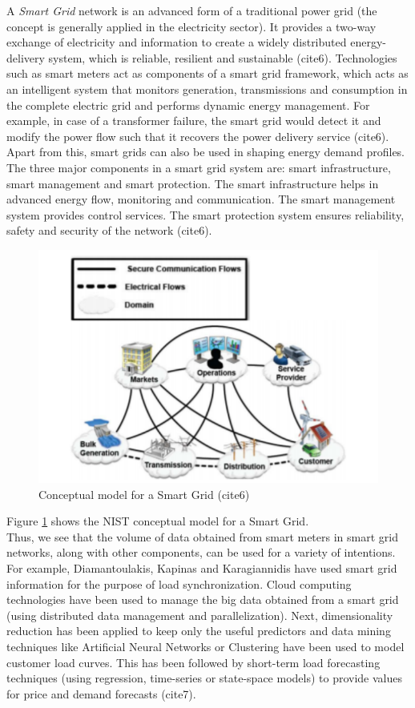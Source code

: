 A {\em Smart Grid} network is an advanced form of a traditional power grid (the concept is generally applied in the electricity sector). It provides a two-way exchange of electricity and information to create a widely distributed energy-delivery system, which is reliable, resilient and sustainable (cite6). Technologies such as smart meters act as components of a smart grid framework, which acts as an intelligent system that monitors generation, transmissions and consumption in the complete electric grid and performs dynamic energy management. For example, in case of a transformer failure, the smart grid would detect it and modify the power flow such that it recovers the power delivery service (cite6). Apart from this, smart grids can also be used in shaping energy demand profiles. The three major components in a smart grid system are: smart infrastructure, smart management and smart protection. The smart infrastructure helps in advanced energy flow, monitoring and communication. The smart management system provides control services. The smart protection system ensures reliability, safety and security of the network (cite6).
\begin{figure}
	\includegraphics[width=\columnwidth]{images/smart_grid.pdf}
	\caption{Conceptual model for a Smart Grid (cite6)}
	\label{F:grid}
\end{figure}
Figure \ref{F:grid} shows the NIST conceptual model for a Smart Grid.\\
Thus, we see that the volume of data obtained from smart meters in smart grid networks, along with other components, can be used for a variety of intentions. For example, Diamantoulakis, Kapinas and Karagiannidis have used smart grid information for the purpose of load synchronization. Cloud computing technologies have been used to manage the big data obtained from a smart grid (using distributed data management and parallelization). Next, dimensionality reduction has been applied to keep only the useful predictors and data mining techniques like Artificial Neural Networks or Clustering have been used to model customer load curves. This has been followed by short-term load forecasting techniques (using regression, time-series or state-space models) to provide values for price and demand forecasts (cite7).
